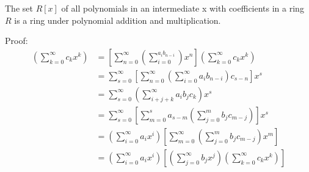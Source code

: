 \documentclass[11pt]{article}
\begin{document}
\begin{theorem}
    The set $R[x]$ of all polynomials in an intermediate x with coefficients in a ring $R$ is a ring under polynomial addition and multiplication.
\end{theorem}
Proof:
\begin{align*}
    [(\sum_{i = 0}^{\infty}a_ix^i)(\sum_{j = 0}^{\infty}b_jx^j)](\sum_{k = 0}^{\infty}c_kx^k) &= [\sum_{n = 0}^{\infty}(\sum_{i = 0}^{a_ib_{n-i}})x^n](\sum_{k = 0}^{\infty}c_kx^k)\\
    &= \sum_{s = 0}^{\infty}[\sum_{n = 0}^{\infty}(\sum_{i = 0}^{\infty}a_ib_{n-i})c_{s-n}]x^s\\
    &= \sum_{s=0}^{\infty}(\sum_{i + j + k}^{\infty}a_ib_jc_k)x^s\\
    &= \sum_{s=0}^{\infty}[\sum_{m=0}^{s}a_{s-m}(\sum_{j=0}^{m}b_jc_{m-j})]x^s\\
    &= (\sum_{i = 0}^{\infty}a_ix^i)[\sum_{m=0}^{\infty}(\sum_{j=0}^{m}b_jc_{m-j})x^m]\\
    &= (\sum_{i = 0}^{\infty}a_ix^i)[(\sum_{j = 0}^{\infty}b_jx^j)(\sum_{k = 0}^{\infty}c_kx^k)]
\end{align*}
\end{document}
